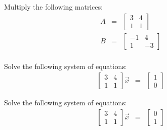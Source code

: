 

\begin{problem} 
\item Multiply the following matrices:
  \begin{eqnarray*}
    A & = & 
    \left[
      \begin{array}{rr}
        3 & 4 \\ 
        1 & 1
      \end{array}
    \right] \\
    B & = & 
    \left[
      \begin{array}{rr}
        -1 & 4 \\
         1 & -3
      \end{array}
    \right] \\
  \end{eqnarray*}

  \vspace{4em}

  \item Solve the following system of equations:
  \begin{eqnarray*}
    \left[
      \begin{array}{rr}
        3 & 4 \\ 
        1 & 1
      \end{array}
    \right] 
    \vec{x} & = & 
    \left[
      \begin{array}{r}
        1 \\
        0
      \end{array}
    \right]
  \end{eqnarray*}

  \vfill

  \item Solve the following system of equations:
  \begin{eqnarray*}
    \left[
      \begin{array}{rr}
        3 & 4 \\ 
        1 & 1
      \end{array}
    \right] 
    \vec{x} & = & 
    \left[
      \begin{array}{r}
        0 \\
        1
      \end{array}
    \right]
  \end{eqnarray*}

  \vfill

\end{problem}


